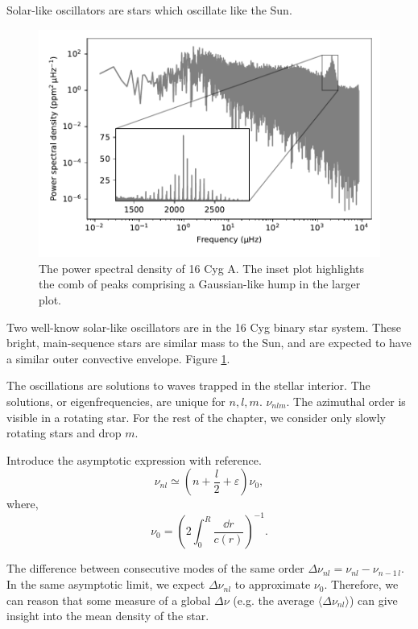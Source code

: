 Solar-like oscillators are stars which oscillate like the Sun.

\begin{figure}[tb]
    \centering
    \includegraphics{figures/seismo-psd.pdf}
    \caption{The power spectral density of 16 Cyg A. The inset plot highlights the comb of peaks comprising a Gaussian-like hump in the larger plot.}
    \label{fig:seismo-psd}
\end{figure}

Two well-know solar-like oscillators are in the 16 Cyg binary star system. These bright, main-sequence stars are similar mass to the Sun, and are expected to have a similar outer convective envelope. Figure \ref{fig:seismo-psd}.

The oscillations are solutions to waves trapped in the stellar interior. The solutions, or eigenfrequencies, are unique for \(n, l, m\). \(\nu_{nlm}\). The azimuthal order is visible in a rotating star. For the rest of the chapter, we consider only slowly rotating stars and drop \(m\).

Introduce the asymptotic expression with reference.
%
\begin{equation}
    \nu_{nl} \simeq (n + \frac{l}{2} + \varepsilon) \nu_0,
\end{equation}
%
where,
%
\begin{equation}
    \nu_0 = \left(2 \int_{0}^{R} \frac{\dd r}{c(r)}\right)^{-1}.
\end{equation}
%

The difference between consecutive modes of the same order \(\Delta\nu_{nl} = \nu_{nl} - \nu_{n-1\,l}\). In the same asymptotic limit, we expect \(\Delta\nu_{nl}\) to approximate \(\nu_0\). Therefore, we can reason that some measure of a global \(\Delta\nu\) (e.g. the average \(\langle\Delta\nu_{nl}\rangle\)) can give insight into the mean density of the star.

